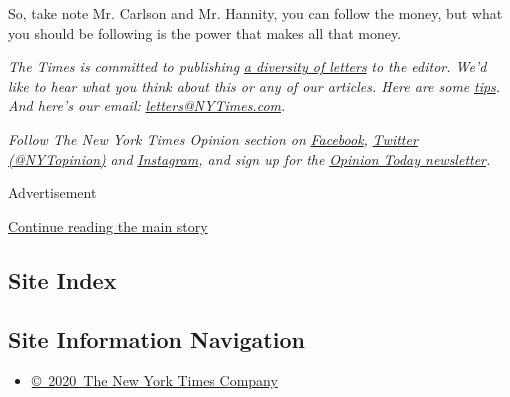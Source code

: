So, take note Mr. Carlson and Mr. Hannity, you can follow the money, but
what you should be following is the power that makes all that money.

\emph{The Times is committed to publishing}
\href{https://www.nytimes3xbfgragh.onion/2019/01/31/opinion/letters/letters-to-editor-new-york-times-women.html}{\emph{a
diversity of letters}} \emph{to the editor. We'd like to hear what you
think about this or any of our articles. Here are some}
\href{https://help.nytimes3xbfgragh.onion/hc/en-us/articles/115014925288-How-to-submit-a-letter-to-the-editor}{\emph{tips}}\emph{.
And here's our email:}
\href{mailto:letters@NYTimes.com}{\emph{letters@NYTimes.com}}\emph{.}

\emph{Follow The New York Times Opinion section on}
\href{https://www.facebookcorewwwi.onion/nytopinion}{\emph{Facebook}}\emph{,}
\href{http://twitter.com/NYTOpinion}{\emph{Twitter (@NYTopinion)}}
\emph{and}
\href{https://www.instagram.com/nytopinion/}{\emph{Instagram}}\emph{,
and sign up for the}
\href{http://www.nytimes3xbfgragh.onion/newsletters/opiniontoday/}{\emph{Opinion
Today newsletter}}\emph{.}

Advertisement

\protect\hyperlink{after-bottom}{Continue reading the main story}

\hypertarget{site-index}{%
\subsection{Site Index}\label{site-index}}

\hypertarget{site-information-navigation}{%
\subsection{Site Information
Navigation}\label{site-information-navigation}}

\begin{itemize}
\tightlist
\item
  \href{https://help.nytimes3xbfgragh.onion/hc/en-us/articles/115014792127-Copyright-notice}{©~2020~The
  New York Times Company}
\end{itemize}

